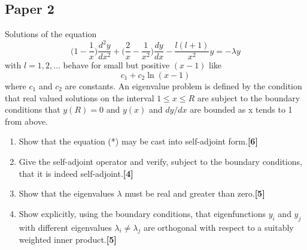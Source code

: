\documentclass[a4paper]{article}
\begin{document}
\subsection{Paper 2}
\begin{qns}
Solutions of the equation
\begin{equation}
    \bigg(1-\frac{1}{x}\bigg)\frac{d^2y}{dx^2}+\bigg(\frac{2}{x}-\frac{1}{x^2}\bigg)\frac{dy}{dx}-\frac{l(l+1)}{x^2}y=-\lambda y\tag{*}
\end{equation}
with $l = 1, 2, . . .$ behave for small but positive $(x − 1)$ like
$$c_1 + c_2\ln(x − 1)$$
where $c_1$ and $c_2$ are constants. An eigenvalue problem is defined by the condition that real valued solutions on the interval $1\leq x\leq R$ are subject to the boundary conditions that $y(R) = 0$ and $y(x)$ and $dy/dx$ are bounded as x tends to 1 from above.
\begin{enumerate}[label=(\roman*)]
    \item Show that the equation (*) may be cast into self-adjoint form.\hfill\textbf{[6]}
    \item Give the self-adjoint operator and verify, subject to the boundary conditions, that it is indeed self-adjoint.\hfill\textbf{[4]}
    \item Show that the eigenvalues $\lambda$ must be real and greater than zero.\hfill\textbf{[5]}
    \item Show explicitly, using the boundary conditions, that eigenfunctions $y_i$ and $y_j$ with different eigenvalues $\lambda_i\neq\lambda_j$ are orthogonal with respect to a suitably weighted inner product.\hfill\textbf{[5]}
\end{enumerate}
\end{qns}
\end{document}
